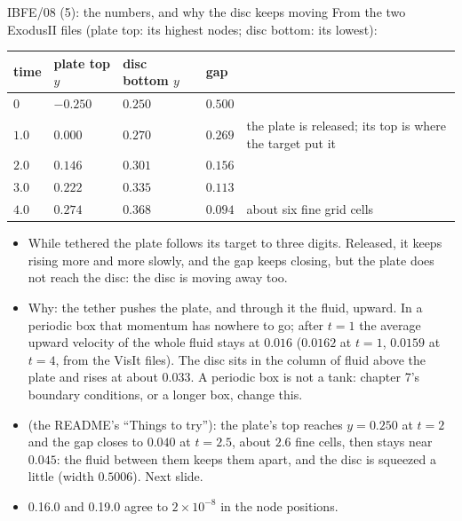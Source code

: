 \documentclass[aspectratio=169,11pt]{beamer}
\begin{document}
\begin{frame}{IBFE/08 (5): the numbers, and why the disc keeps moving}
\label{fr:results}
\footnotesize
From the two ExodusII files (plate top: its highest nodes; disc bottom: its lowest):
\begin{tabular}{@{}lllll@{}}
\toprule
time & plate top $y$ & disc bottom $y$ & gap & \\
\midrule
$0$ & $-0.250$ & $0.250$ & $0.500$ & \\
$1.0$ & $0.000$ & $0.270$ & $0.269$ & the plate is released; its top is where the target put it \\
$2.0$ & $0.146$ & $0.301$ & $0.156$ & \\
$3.0$ & $0.222$ & $0.335$ & $0.113$ & \\
$4.0$ & $0.274$ & $0.368$ & $0.094$ & about six fine grid cells \\
\bottomrule
\end{tabular}

\medskip
\begin{itemize}
  \item While tethered the plate follows its target to three digits. Released, it keeps rising more and more slowly, and the gap keeps closing, but the plate does not reach the disc: the disc is moving away too.
  \item Why: the tether pushes the plate, and through it the fluid, upward. In a periodic box that momentum has nowhere to go; after $t = 1$ the average upward velocity of the whole fluid stays at $0.016$ ($0.0162$ at $t = 1$, $0.0159$ at $t = 4$, from the VisIt files). The disc sits in the column of fluid above the plate and rises at about $0.033$. A periodic box is not a tank: chapter 7's boundary conditions, or a longer box, change this.
  \item {} (the README's ``Things to try''): the plate's top reaches $y = 0.250$ at $t = 2$ and the gap closes to $0.040$ at $t = 2.5$, about $2.6$ fine cells, then stays near $0.045$: the fluid between them keeps them apart, and the disc is squeezed a little (width $0.5006$). Next slide.
  \item 0.16.0 and 0.19.0 agree to $2\times10^{-8}$ in the node positions.
\end{itemize}
\end{frame}
\end{document}
